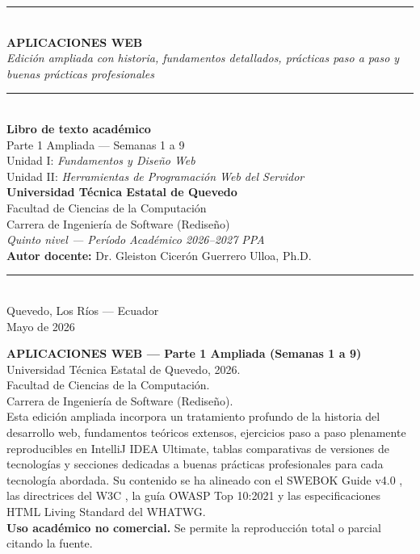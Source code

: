 \documentclass[11pt,a4paper,openany]{book}
\begin{document}
\begin{titlepage}
\centering\vspace*{1cm}
{\color{uteqverde}\rule{\linewidth}{2pt}}\\[0.6cm]
{\Huge\bfseries\color{uteqverde} APLICACIONES WEB}\\[0.4cm]
{\Large\itshape Edición ampliada con historia, fundamentos detallados, prácticas paso a paso y buenas prácticas profesionales}\\[0.3cm]
{\color{uteqverde}\rule{\linewidth}{1pt}}\\[1.2cm]
{\Large\bfseries Libro de texto académico}\\[0.3cm]
{\large Parte 1 Ampliada --- Semanas 1 a 9}\\[0.3cm]
{\large Unidad I: \emph{Fundamentos y Diseño Web}}\\
{\large Unidad II: \emph{Herramientas de Programación Web del Servidor}}\\[2cm]
{\large\bfseries Universidad Técnica Estatal de Quevedo}\\
{\large Facultad de Ciencias de la Computación}\\
{\large Carrera de Ingeniería de Software (Rediseño)}\\[0.7cm]
{\large\itshape Quinto nivel --- Período Académico 2026--2027 PPA}\\[1.5cm]
{\large \textbf{Autor docente:} Dr. Gleiston Cicerón Guerrero Ulloa, Ph.D.}\\[2cm]
{\color{uteqdorado}\rule{\linewidth}{2pt}}\\[0.4cm]
{\large Quevedo, Los Ríos --- Ecuador}\\
{\large Mayo de 2026}
\end{titlepage}

\thispagestyle{empty}
\vspace*{2cm}
\noindent\textbf{APLICACIONES WEB --- Parte 1 Ampliada (Semanas 1 a 9)}\\[0.3cm]
\noindent Universidad Técnica Estatal de Quevedo, 2026.\\
Facultad de Ciencias de la Computación.\\
Carrera de Ingeniería de Software (Rediseño).\\[0.4cm]
\noindent Esta edición ampliada incorpora un tratamiento profundo de
la historia del desarrollo web, fundamentos teóricos extensos,
ejercicios paso a paso plenamente reproducibles en IntelliJ IDEA
Ultimate, tablas comparativas de versiones de tecnologías y secciones
dedicadas a buenas prácticas profesionales para cada tecnología
abordada. Su contenido se ha alineado con el SWEBOK Guide v4.0
\cite{washizaki2024swebok}, las directrices del W3C
\cite{w3c2018wcag}, la guía OWASP Top 10:2021 \cite{owasp2021top10}
y las especificaciones HTML Living Standard del WHATWG.\\[0.4cm]
\noindent\textbf{Uso académico no comercial.} Se permite la
reproducción total o parcial citando la fuente.
\newpage
\end{document}
